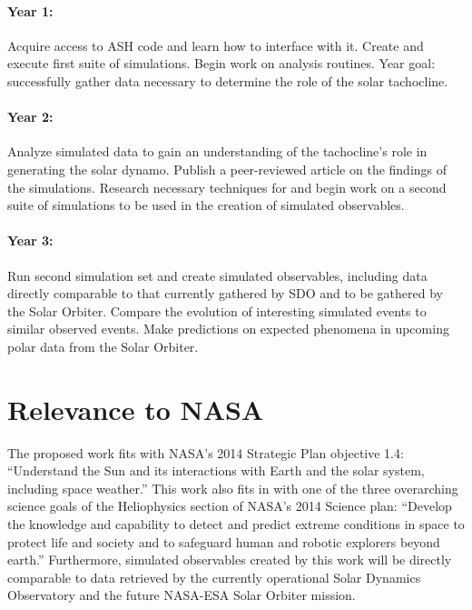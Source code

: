 \documentclass[aasms,12pt]{article}
\begin{document}
\paragraph{Year 1:}
Acquire access to ASH code and learn how to interface with it.
Create and execute first suite of simulations.  Begin work on analysis
routines.  Year goal: successfully gather data
necessary to determine the role of the solar tachocline.
\vspace{-0.5cm}
\paragraph{Year 2:}
Analyze simulated data to gain an understanding of the tachocline's role in
generating the solar dynamo.  Publish a peer-reviewed article on the findings
of the simulations.  Research necessary techniques for and begin work on 
a second suite of simulations to be
used in the creation of simulated observables.  
\vspace{-0.5cm}
\paragraph{Year 3:}
Run second simulation set and create simulated observables, including data
directly comparable to that currently gathered by SDO and to be gathered by the
Solar Orbiter.  Compare the evolution of interesting simulated
events to similar observed events.  Make predictions on expected phenomena in
upcoming polar data from the Solar Orbiter.


\newpage

\section{Relevance to NASA} 
The proposed work fits with NASA's 2014 Strategic Plan objective
1.4:
``Understand the Sun and its interactions with Earth and the solar
system, including space weather.''
This work also fits in with one of the three overarching science goals
of the Heliophysics section of NASA's 2014 Science plan: 
``Develop the
knowledge and capability to detect and predict extreme conditions in space to
protect life and society and to safeguard human and robotic explorers beyond
earth.''  Furthermore, simulated observables created by this work will be
directly comparable to data retrieved by the currently operational Solar
Dynamics Observatory and the future NASA-ESA Solar Orbiter mission.
\end{document}
